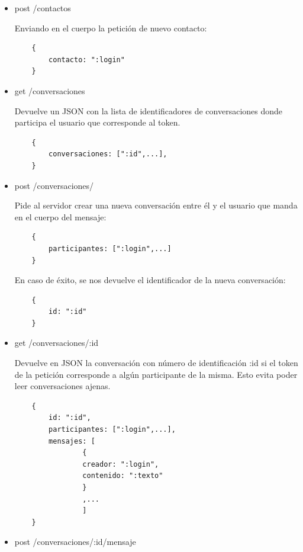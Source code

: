 \documentclass[]{article}
\begin{document}
\begin{itemize}
	\begin{BVerbatim}
	{
		contactos: [":login",...],
		esperas: [":login",...]
	}
	\end{BVerbatim}
	
	\item post /contactos
	
	Enviando en el cuerpo la petición de nuevo contacto:
	
	\begin{BVerbatim}
	{
		contacto: ":login"
	}
	\end{BVerbatim}
	
	
	\item get /conversaciones
	
	Devuelve un JSON con la lista de identificadores de conversaciones donde participa el usuario que corresponde al token.
	
	\begin{BVerbatim}
	{
		conversaciones: [":id",...],
	}
	\end{BVerbatim}
	
	\item post /conversaciones/
	
	Pide al servidor crear una nueva conversación entre él y el usuario que manda en el cuerpo del mensaje:
	
	\begin{BVerbatim}
	{
		participantes: [":login",...]
	}
	\end{BVerbatim}
	
	En caso de éxito, se nos devuelve el identificador de la nueva conversación:
	
	\begin{BVerbatim}
	{
		id: ":id"
	}
	\end{BVerbatim}
	
	
	
	\item get /conversaciones/:id
	
	Devuelve en JSON la conversación con número de identificación :id si el token de la petición corresponde a algún participante de la misma. Esto evita poder leer conversaciones ajenas.
	
	\begin{BVerbatim}
	{
		id: ":id",
		participantes: [":login",...],
		mensajes: [
				{
				creador: ":login",
				contenido: ":texto"
				}
				,...
		        ]
	}
	\end{BVerbatim}
	
	
	\item post /conversaciones/:id/mensaje
	

\end{itemize}
\end{document}
